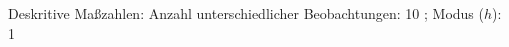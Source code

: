 				\label{tableValues:astu03b_g2}
				\vspace*{-\baselineskip}
                    \begin{noten}
                	    \note{} Deskritive Maßzahlen:
                	    Anzahl unterschiedlicher Beobachtungen: 10%
                	    ; 
                	      Modus ($h$): 1
                     \end{noten}


